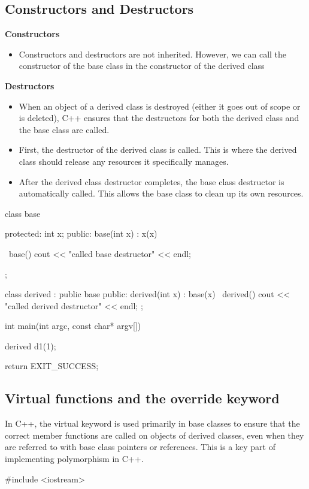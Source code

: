 \documentclass{report}
\begin{document}
\begin{concept}
    \subsection{Constructors and Destructors}
    \bigbreak \noindent 
    \begin{concept}
        \bigbreak \noindent 
        \textbf{Constructors}
    \begin{itemize}
       \item Constructors and destructors are not inherited. However, we can call the constructor of the base class in the constructor of the derived class
    \end{itemize} 
    \bigbreak \noindent 
    \textbf{Destructors}
    \begin{itemize}
        \item When an object of a derived class is destroyed (either it goes out of scope or is deleted), C++ ensures that the destructors for both the derived class and the base class are called.
        \item First, the destructor of the derived class is called. This is where the derived class should release any resources it specifically manages.
        \item After the derived class destructor completes, the base class destructor is automatically called. This allows the base class to clean up its own resources.
    \end{itemize}
    \end{concept}
    \bigbreak \noindent 
    \begin{cppcode}
        class base {
        protected:
            int x;
        public: 
            base(int x) : x(x) {}

            ~base() {
                cout << "called base destructor" << endl;
            }
        };

        class derived : public base {
        public: 
            derived(int x) : base(x) {}
            ~derived() {
                cout << "called derived destructor" << endl;
            }
        };

        int main(int argc, const char* argv[]) {

            derived d1(1);


            return EXIT_SUCCESS;
        }
    \end{cppcode}

    \pagebreak 
    \subsection{Virtual functions and the override keyword}
    \bigbreak \noindent 
    \begin{concept}
       In C++, the virtual keyword is used primarily in base classes to ensure that the correct member functions are called on objects of derived classes, even when they are referred to with base class pointers or references. This is a key part of implementing polymorphism in C++. 
    \end{concept}
    \bigbreak \noindent 
    \begin{cppcode}
#include <iostream>


\end{cppcode}
\end{concept}
\end{document}
